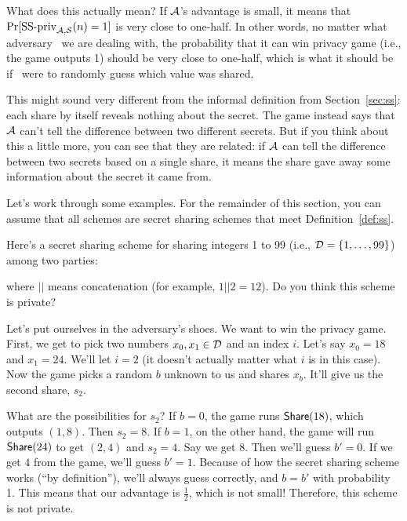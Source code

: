 What does this actually mean? If $\mathcal{A}$'s advantage is small, it means that 
$\Pr[\textnormal{SS-priv}_{\mathcal{A},\mathcal{S}}(n)=1]$ is very close to one-half. In 
other words, no matter what adversary \A~we are dealing with, the probability 
that it can win privacy game (i.e., the game outputs 1) should be very close
to one-half, which is what it should be if \A~were to randomly guess which 
value was shared.

This might sound very different from the informal definition from Section~\ref{sec:ss}:
each share by itself reveals nothing about the secret. The game instead says 
that $\mathcal{A}$ can't tell the difference between two different secrets. But if 
you think about this a little more, you can see that they are related: if 
$\mathcal{A}$ can tell the difference between two secrets based on a single share, 
it means the share gave away some information about the secret it came from.

\bigskip
Let's work through some examples. For the remainder of this section, you can 
assume that all schemes are secret sharing schemes that meet Definition~\ref{def:ss}.

\begin{example}
    Here's a secret sharing scheme for sharing integers 1 to 99 (i.e., 
    $\mathcal{D} = \{1, \ldots, 99\}$) among two parties:
    \begin{pchstack}[center]
    \pchspace
    \end{pchstack}
    where $||$ means concatenation (for example, $1 || 2 = 12$). Do you 
    think this scheme is private?

    Let's put ourselves in the adversary's shoes. We want to win the 
    privacy game. First, we get to pick two numbers $x_0, x_1 \in \mathcal{D}$ and 
    an index $i$. Let's say $x_0 = 18$ and $x_1 = 24$. We'll let $i=2$ 
    (it doesn't actually matter what $i$ is in this case). Now the game 
    picks a random $b$ unknown to us and shares $x_b$. It'll give us the 
    second share, $s_2$. 
    
    What are the possibilities for $s_2$? If $b=0$, the game runs $\mathsf{Share}(18)$,
    which outputs $(1,8)$. Then $s_2 = 8$. If $b=1$, on the other hand, 
    the game will run $\mathsf{Share}(24)$ to get $(2,4)$ and $s_2 = 4$. Say 
    we get $8$. Then we'll guess $b' = 0$. If we get $4$ from the game, we'll 
    guess $b'=1$. Because of how the secret sharing scheme works (``by 
    definition''), we'll always guess correctly, and $b=b'$ with probability 
    1. This means that our advantage is $\frac{1}{2}$, which is not small!
    Therefore, this scheme is not private.
\end{example}

